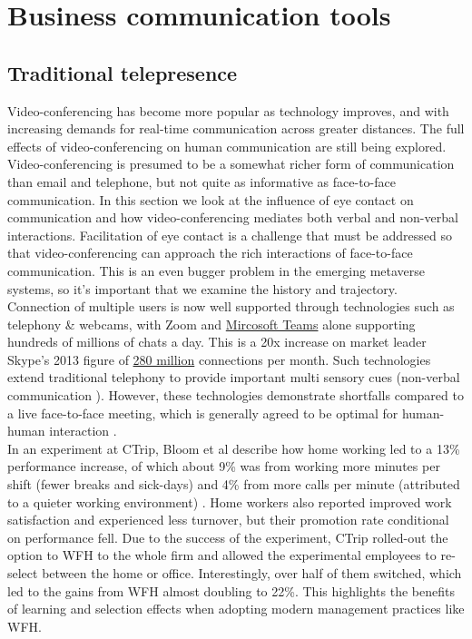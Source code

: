 
\section{Business communication tools}
\subsection{Traditional telepresence}
Video-conferencing has become more popular as technology improves, and with increasing demands for real-time communication across greater distances. The full effects of video-conferencing on human communication are still being explored. Video-conferencing is presumed to be a somewhat richer form of communication than email and telephone, but not quite as informative as face-to-face communication. In this section we look at the influence of eye contact on communication and how video-conferencing mediates both verbal and non-verbal interactions. Facilitation of eye contact is a challenge that must be addressed so that video-conferencing can approach the rich interactions of face-to-face communication. This is an even bugger problem in the emerging metaverse systems, so it's important that we examine the history and trajectory.\\
Connection of multiple users is now well supported through technologies such as telephony \& webcams, with Zoom and \href{https://www.microsoft.com/en-us/Investor/earnings/FY-2021-Q1/press-release-webcast}{Mircosoft Teams} alone supporting hundreds of millions of chats a day. This is a 20x increase on market leader Skype's 2013 figure of \href{https://www.microsoft.com/en-us/Investor/earnings/FY-2013-Q1/press-release-webcast}{280 million} connections per month. Such technologies extend traditional telephony to provide important multi sensory cues (non-verbal communication \cite{Argyle1976, Wolff2008}).  However, these technologies demonstrate shortfalls compared to a live face-to-face meeting, which is generally agreed to be optimal for human-human interaction \cite{Wolff2008}.\\
In an experiment at CTrip, Bloom et al describe how home working led to a 13\% performance increase, of which about 9\% was from working more minutes per shift (fewer breaks and sick-days) and 4\% from more calls per minute (attributed to a quieter working environment) \cite{Bloom2015}. Home workers also reported improved work satisfaction and experienced less turnover, but their promotion rate conditional on performance fell. Due to the success of the experiment, CTrip rolled-out the option to WFH to the whole firm and allowed the experimental employees to re-select between the home or office. Interestingly, over half of them switched, which led to the gains from WFH almost doubling to 22\%. This highlights the benefits of learning and selection effects when adopting modern management practices like WFH.\\
